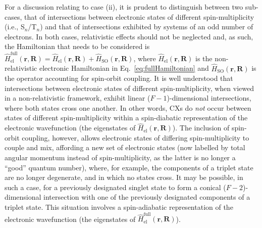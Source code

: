 \documentclass[9pt,bestpractices]{livecoms}
\newcommand{\R}{\mathbf{R}}
\newcommand{\re}{\mathbf{r}}
\begin{document}
For a discussion relating to case (ii), it is prudent to distinguish between two sub-cases, that of intersections between electronic states of different spin-multiplicity (i.e., S$_n$/T$_n$) and that of intersections exhibited by systems of an odd number of electrons.
In both cases, relativistic effects should not be neglected and, as such, the Hamiltonian that needs to be considered is $\hat{H}_{\text{el}}^\text{full}(\re,\R) = \hat{H}_{\text{el}}(\re,\R) + \hat{H}_{\text{SO}}(\re,\R)$, where $\hat{H}_{\text{el}}(\re,\R)$ is the non-relativistic electronic Hamiltonian in Eq.~\eqref{eq:fullHamiltonian} and $\hat{H}_{\text{SO}}(\re,\R)$ is the operator accounting for spin-orbit coupling.
It is well understood that intersections between electronic states of different spin-multiplicity, when viewed in a non-relativistic framework, exhibit linear ($F - 1$)-dimensional intersections, where both states cross one another.\cite{matsika2002conical, matsunaga2004modelling}
In other words, CXs do \textit{not} occur between states of different spin-multiplicity within a spin-diabatic representation of the electronic wavefunction (the eigenstates of $\hat{H}_{\text{el}}(\re,\R)$).
The inclusion of spin-orbit coupling, however, allows electronic states of differing spin-multiplicity to couple and mix, affording a new set of electronic states (now labelled by total angular momentum instead of spin-multiplicity, as the latter is no longer a ``good'' quantum number\cite{Curchodatmophotochem2024}), where, for example, the components of a triplet state are no longer degenerate, and in which no states cross.
It may be possible, in such a case, for a previously designated singlet state to form a conical ($F - 2$)-dimensional intersection with one of the previously designated components of a triplet state.
This situation involves a spin-adiabatic representation of the electronic wavefunction (the eigenstates of $\hat{H}_{\text{el}}^\text{full}(\re,\R)$).
\end{document}
